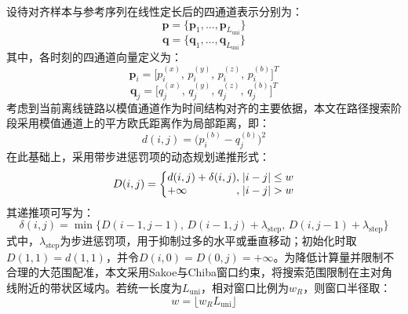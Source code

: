\documentclass{xdupgthesis}
\begin{document}
\enlargethispage{\baselineskip}
{\setlength{\abovedisplayskip}{8pt}
\setlength{\belowdisplayskip}{8pt}
\setlength{\abovedisplayshortskip}{8pt}
\setlength{\belowdisplayshortskip}{8pt}
设待对齐样本与参考序列在线性定长后的四通道表示分别为：
\begin{equation}
    \mathbf{p}=\{\mathbf{p}_1,\ldots,\mathbf{p}_{L_{\mathrm{uni}}}\}
\end{equation}
\begin{equation}
    \mathbf{q}=\{\mathbf{q}_1,\ldots,\mathbf{q}_{L_{\mathrm{uni}}}\}
\end{equation}
其中，各时刻的四通道向量定义为：
\begin{equation}
    \mathbf{p}_i=\big[p_i^{(x)},\,p_i^{(y)},\,p_i^{(z)},\,p_i^{(b)}\big]^T
\end{equation}
\vspace{2pt}
\begin{equation}
    \mathbf{q}_j=\big[q_j^{(x)},\,q_j^{(y)},\,q_j^{(z)},\,q_j^{(b)}\big]^T
\end{equation}
考虑到当前离线链路以模值通道作为时间结构对齐的主要依据，本文在路径搜索阶段采用模值通道上的平方欧氏距离作为局部距离，即：
\begin{equation}
    d(i,j)=\big(p_i^{(b)}-q_j^{(b)}\big)^2
\end{equation}
}
在此基础上，采用带步进惩罚项的动态规划递推形式：
\begin{equation}
    D(i,j)=
    \left\{
    \begin{array}{@{}l@{,\;}l@{}}
        d(i,j)+\delta(i,j) & |i-j|\le w\\
        +\infty & |i-j|>w
    \end{array}
    \right.
\end{equation}
其递推项可写为：
\begin{equation}
    \delta(i,j)=\min\big\{D(i-1,j-1),\,D(i-1,j)+\lambda_{\mathrm{step}},\,D(i,j-1)+\lambda_{\mathrm{step}}\big\}
\end{equation}
式中，$\lambda_{\mathrm{step}}$为步进惩罚项，用于抑制过多的水平或垂直移动；初始化时取$D(1,1)=d(1,1)$，并令$D(i,0)=D(0,j)=+\infty$。为降低计算量并限制不合理的大范围配准，本文采用Sakoe与Chiba窗口约束，将搜索范围限制在主对角线附近的带状区域内。若统一长度为$L_{\mathrm{uni}}$，相对窗口比例为$w_R$，则窗口半径取：
\begin{equation}
    w=\lfloor w_R L_{\mathrm{uni}} \rfloor
\end{equation}
\end{document}
